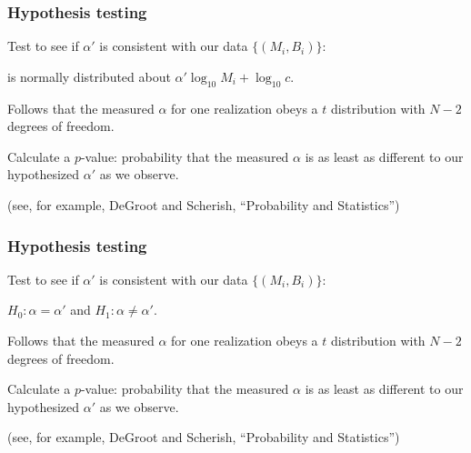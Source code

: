 \begin{frame}
  \frametitle{Hypothesis testing}

Test to see if $\alpha'$ is consistent
with our data $\{(M_i,B_i)\}$:


\inv

is normally distributed
about $\alpha' \log_{10} M_i + \log_{10} c$.

Follows that the measured $\alpha$ for
one realization obeys
a $t$ distribution with $N-2$ degrees of freedom.

Calculate a $p$-value: probability that the measured
$\alpha$ is as least as different to our hypothesized
$\alpha'$ as we observe.

{\tiny (see, for example, DeGroot and Scherish, ``Probability and Statistics'')}

\vis


\end{frame}

\begin{frame}
  \frametitle{Hypothesis testing}

Test to see if $\alpha'$ is consistent
with our data $\{(M_i,B_i)\}$:

$H_0: \alpha = \alpha'$ and $H_1: \alpha \ne \alpha'.$


\inv 

Follows that the measured $\alpha$ for
one realization obeys
a $t$ distribution with $N-2$ degrees of freedom.

Calculate a $p$-value: probability that the measured
$\alpha$ is as least as different to our hypothesized
$\alpha'$ as we observe.

{\tiny (see, for example, DeGroot and Scherish, ``Probability and Statistics'')}

\vis

\end{frame}

